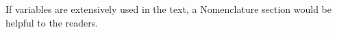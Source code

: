 \documentclass[letterpaper]{physor2020}
\begin{document}

%
If variables are extensively used in the text, a Nomenclature section would be helpful to the readers.
%
%

\setlength{\baselineskip}{12pt}



%
\end{document}

